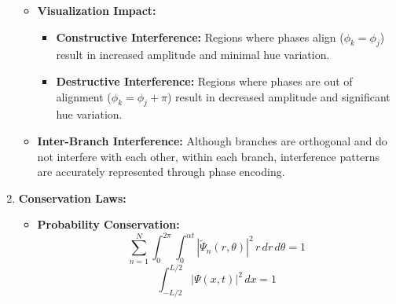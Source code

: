 \documentclass[12pt]{article}
\begin{document}
\begin{enumerate}
\begin{itemize}
        \item \textbf{Visualization Impact:}
        \begin{itemize}
            \item \textbf{Constructive Interference:} Regions where phases align (\(\phi_k = \phi_j\)) result in increased amplitude and minimal hue variation.
            \item \textbf{Destructive Interference:} Regions where phases are out of alignment (\(\phi_k = \phi_j + \pi\)) result in decreased amplitude and significant hue variation.
        \end{itemize}
        
        \item \textbf{Inter-Branch Interference:}
        Although branches are orthogonal and do not interfere with each other, within each branch, interference patterns are accurately represented through phase encoding.
    \end{itemize}
    
    \item \textbf{Conservation Laws:}
    \begin{itemize}
        \item \textbf{Probability Conservation:}
        \[
        \sum_{n=1}^{N} \int_{0}^{2\pi} \int_{0}^{\alpha t} |\tilde{\Psi}_n(r,\theta)|^2 \, r \, dr \, d\theta = 1
        \]
        \[
        \int_{-L/2}^{L/2} |\Psi(x,t)|^2 \, dx = 1
        \]
        

\end{itemize}
\end{enumerate}
\end{document}
